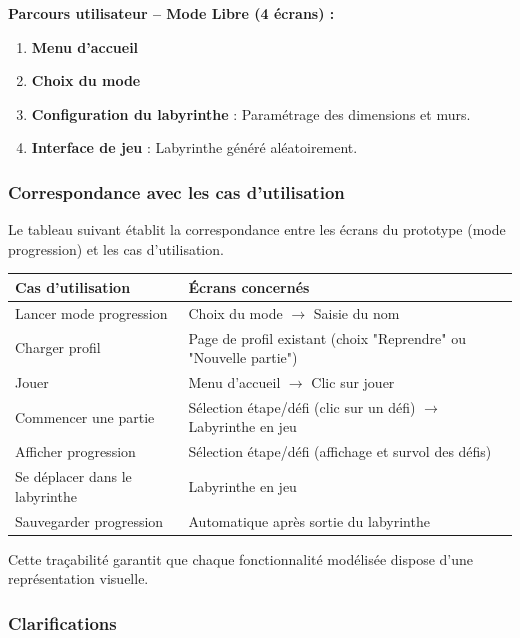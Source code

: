 \documentclass{butexFR}
\begin{document}
\textbf{Parcours utilisateur -- Mode Libre (4 écrans) :}

\begin{enumerate}
    \item \textbf{Menu d'accueil}
    \item \textbf{Choix du mode}
    \item \textbf{Configuration du labyrinthe} : Paramétrage des dimensions et murs.
    \item \textbf{Interface de jeu} : Labyrinthe généré aléatoirement.
\end{enumerate}

\subsubsection{Correspondance avec les cas d'utilisation}

Le tableau suivant établit la correspondance entre les écrans du prototype (mode progression) et les cas d'utilisation.

\vspace{1em}
\begin{center}
\begin{tabular}{|p{5cm}|p{8cm}|}
\hline
\textbf{Cas d'utilisation} & \textbf{Écrans concernés} \\
\hline
Lancer mode progression & Choix du mode $\rightarrow$ Saisie du nom \\
\hline
Charger profil & Page de profil existant (choix "Reprendre" ou "Nouvelle partie") \\
\hline
Jouer & Menu d'accueil $\rightarrow$ Clic sur jouer\\
\hline
Commencer une partie & Sélection étape/défi (clic sur un défi) $\rightarrow$ Labyrinthe en jeu \\
\hline
Afficher progression & Sélection étape/défi (affichage et survol des défis) \\
\hline
Se déplacer dans le labyrinthe & Labyrinthe en jeu \\
\hline
Sauvegarder progression & Automatique après sortie du labyrinthe \\
\hline
\end{tabular}
\end{center}
\vspace{1em}

Cette traçabilité garantit que chaque fonctionnalité modélisée dispose d'une représentation visuelle.

\subsubsection{Clarifications}
\end{document}
